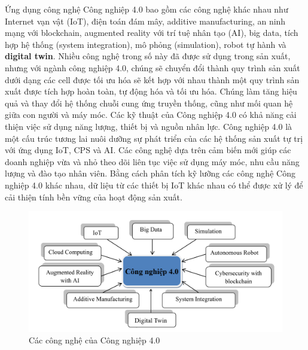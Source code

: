 Ứng dụng công nghệ Công nghiệp 4.0 bao gồm các công nghệ khác nhau như Internet vạn vật (IoT), điện toán đám mây, additive manufacturing, an ninh mạng với blockchain, augmented reality với trí tuệ nhân tạo (AI), big data, tích hợp hệ thống (system integration), mô phỏng (simulation), robot tự hành và \textbf{digital twin}. Nhiều công nghệ trong số này đã được sử dụng trong sản xuất, nhưng với ngành công nghiệp 4.0, chúng sẽ chuyển đổi thành quy trình sản xuất dưới dạng các cell được tối ưu hóa sẽ kết hợp với nhau thành một quy trình sản xuất được tích hợp hoàn toàn, tự động hóa và tối ưu hóa. Chúng làm tăng hiệu quả và thay đổi hệ thống chuỗi cung ứng truyền thống, cũng như mối quan hệ giữa con người và máy móc. Các kỹ thuật của Công nghiệp 4.0 có khả năng cải thiện việc sử dụng năng lượng, thiết bị và nguồn nhân lực. Công nghiệp 4.0 là một cấu trúc tương lai nuôi dưỡng sự phát triển của các hệ thống sản xuất tự trị với ứng dụng IoT, CPS và AI. Các công nghệ dựa trên cảm biến mới giúp các doanh nghiệp vừa và nhỏ theo dõi liên tục việc sử dụng máy móc, nhu cầu năng lượng và đào tạo nhân viên. Bằng cách phân tích kỹ lưỡng các công nghệ Công nghiệp 4.0 khác nhau, dữ liệu từ các thiết bị IoT khác nhau có thể được xử lý để cải thiện tính bền vững của hoạt động sản xuất.

\begin{figure}[!h]
    \centering
    \includegraphics[width=\textwidth]{Images/Intro/4.0appliction.jpg}
    \caption{Các công nghệ của Công nghiệp 4.0}
    \label{fig:0appliction}
\end{figure}


